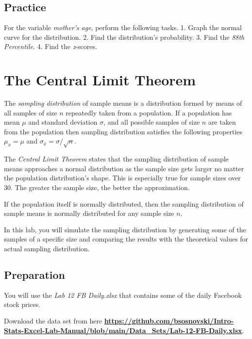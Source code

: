 \documentclass[
]{book}
\begin{document}
\hypertarget{practice-9}{%
\section{Practice}\label{practice-9}}

For the variable \emph{mother's age}, perform the following tasks.
1. Graph the normal curve for the distribution.
2. Find the distribution's probability.
3. Find the \emph{88th Percentile}.
4. Find the \emph{z}-scores.

\hypertarget{the-central-limit-theorem}{%
\chapter{The Central Limit Theorem}\label{the-central-limit-theorem}}

The \emph{sampling distribution} of sample means is a distribution formed by means of all samples of size \(n\) repeatedly taken from a population. If a population has mean \(\mu\) and standard deviation \(\sigma\), and all possible samples of size \(n\) are taken from the population then sampling distribution satisfies the following properties \(\mu_{\bar{x}}=\mu\) and \(\sigma_{\bar{x}}=\sigma/\sqrt{n}\).

The \emph{Central Limit Theorem} states that the sampling distribution of sample means approaches a normal distribution as the sample size gets larger no matter the population distribution's shape. This is especially true for sample sizes over 30. The greater the sample size, the better the approximation.

If the population itself is normally distributed, then the sampling distribution of sample means is normally distributed for any sample size \(n\).

In this lab, you will simulate the sampling distribution by generating some of the samples of a specific size and comparing the results with the theoretical values for actual sampling distribution.

\hypertarget{preparation-8}{%
\section{Preparation}\label{preparation-8}}

You will use the \emph{Lab 12 FB Daily.xlsx} that contains some of the daily Facebook stock prices.

Download the data set from here \href{https://github.com/bsosnovski/Intro-Stats-Excel-Lab-Manual/blob/main/Data_Sets/Lab-12-FB-Daily.xlsx}{\textbf{https://github.com/bsosnovski/Intro-Stats-Excel-Lab-Manual/blob/main/Data\_Sets/Lab-12-FB-Daily.xlsx}}.
\end{document}
